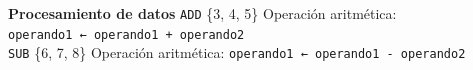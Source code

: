 \documentclass[12pt,oneside]{templates/unerthesis}
\begin{document}
\textbf{Procesamiento de datos}\textbar{} \texttt{ADD} \textbar{} \{3, 4, 5\} \textbar{} Operación aritmética: \texttt{operando1\ ←\ operando1\ +\ operando2} \textbar{}\\
\hspace*{0.333em}\hspace*{0.333em}\hspace*{0.333em}\hspace*{0.333em}\hspace*{0.333em}\hspace*{0.333em}\hspace*{0.333em}\hspace*{0.333em}\hspace*{0.333em}\hspace*{0.333em}\hspace*{0.333em}\hspace*{0.333em}\hspace*{0.333em}\hspace*{0.333em}\hspace*{0.333em}\hspace*{0.333em}\hspace*{0.333em}\hspace*{0.333em}\hspace*{0.333em}\hspace*{0.333em}\hspace*{0.333em}\hspace*{0.333em}\hspace*{0.333em}\hspace*{0.333em}\hspace*{0.333em}\hspace*{0.333em}\textbar{} \texttt{SUB} \textbar{} \{6, 7, 8\} \textbar{} Operación aritmética: \texttt{operando1\ ←\ operando1\ -\ operando2} \textbar{}\\
\end{document}
